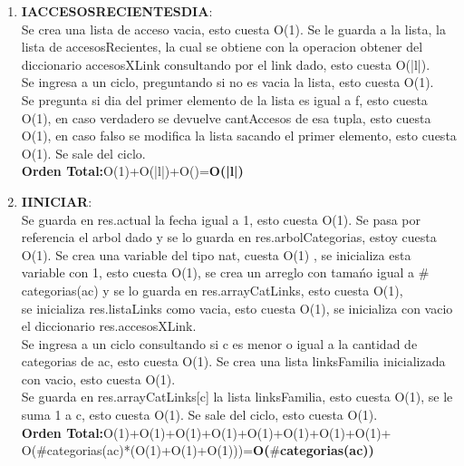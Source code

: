\documentclass[10pt, a4paper]{article}
\begin{document}
\begin{enumerate}
     \item \textbf{IACCESOSRECIENTESDIA}:\\ Se crea una lista de acceso vacia, esto cuesta O(1). Se le guarda a la lista, la lista de accesosRecientes,
 la cual se obtiene con la operacion obtener del diccionario accesosXLink consultando por el link dado, esto cuesta O(|l|). \\
Se ingresa a un ciclo, preguntando si no es vacia la lista, esto cuesta O(1).\\
Se pregunta si dia del primer elemento de la lista es igual a f, esto cuesta O(1), en caso verdadero se devuelve cantAccesos de esa tupla, esto cuesta O(1), en caso falso se modifica la lista sacando el primer elemento, esto cuesta O(1). Se sale del ciclo. \\
      \textbf{Orden Total:}O(1)+O(|l|)+O()=\textbf{O(|l|)}

      \item \textbf{IINICIAR}:\\ Se guarda en res.actual la fecha igual a 1, esto cuesta O(1). Se pasa por referencia el arbol dado y se lo guarda en res.arbolCategorias, estoy cuesta O(1).
Se crea una variable del tipo nat, cuesta O(1) , se inicializa esta variable con 1, esto cuesta O(1), se crea un arreglo con tama\'no  igual a $\#$categorias(ac) y se lo guarda en res.arrayCatLinks, esto cuesta O(1),\\
 se inicializa res.listaLinks como vacia, esto cuesta O(1), se inicializa con vacio el diccionario res.accesosXLink. \\
Se ingresa a un ciclo consultando si c es menor o igual a la cantidad de categorias de ac, esto cuesta O(1). Se crea una lista linksFamilia inicializada con vacio, esto cuesta O(1). \\
Se guarda en res.arrayCatLinks[c] la lista linksFamilia, esto cuesta O(1), se le suma 1 a c, esto cuesta O(1). Se sale del ciclo, esto cuesta O(1). \\
	 \textbf{Orden Total:}O(1)+O(1)+O(1)+O(1)+O(1)+O(1)+O(1)+O(1)+\\O($\#$categorias(ac)*(O(1)+O(1)+O(1)))=\textbf{O($\#$categorias(ac))}


\end{enumerate}
\end{document}

